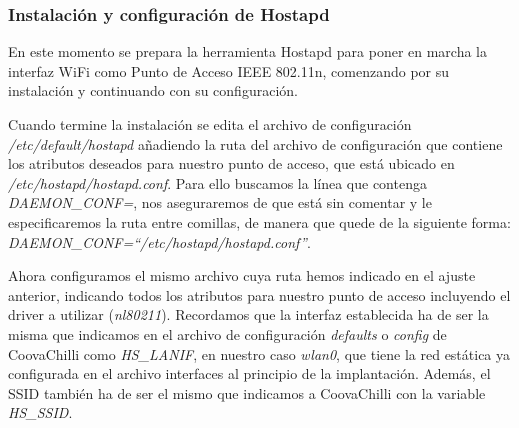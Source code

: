 
\subsubsection{Instalación y configuración de Hostapd} \label{HostapdInstallConfig}

En este momento se prepara la herramienta Hostapd para poner en marcha la interfaz WiFi como Punto de Acceso IEEE 802.11n, comenzando por su instalación y continuando con su configuración.


Cuando termine la instalación se edita el archivo de configuración \emph{/etc/default/hostapd} añadiendo la ruta del archivo de configuración que contiene los atributos deseados para nuestro punto de acceso, que está ubicado en \emph{/etc/hostapd/hostapd.conf}. Para ello buscamos la línea que contenga \emph{DAEMON\_CONF=}, nos aseguraremos de que está sin comentar y le especificaremos la ruta entre comillas, de manera que quede de la siguiente forma: \emph{DAEMON\_CONF=``/etc/hostapd/hostapd.conf''}.

Ahora configuramos el mismo archivo cuya ruta hemos indicado en el ajuste anterior, indicando todos los atributos para nuestro punto de acceso incluyendo el driver a utilizar (\emph{nl80211}). Recordamos que la interfaz establecida ha de ser la misma que indicamos en el archivo de configuración \emph{defaults} o \emph{config} de CoovaChilli como \emph{HS\_LANIF}, en nuestro caso \emph{wlan0}, que tiene la red estática ya configurada en el archivo interfaces al principio de la implantación. Además, el SSID también ha de ser el mismo que indicamos a CoovaChilli con la variable \emph{HS\_SSID}.

